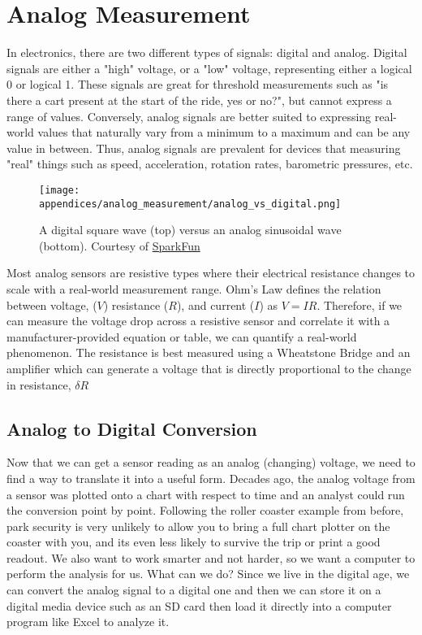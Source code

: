 \chapter{Analog Measurement} 
In electronics, there are two different types of signals: digital and analog.
Digital signals are either a "high" voltage, or a "low" voltage, representing either a logical 0 or logical 1.
These signals are great for threshold measurements such as "is there a cart present at the start of the ride, yes or no?", but cannot express a range of values.
Conversely, analog signals are better suited to expressing real-world values that naturally vary from a minimum to a maximum and can be any value in between.
Thus, analog signals are prevalent for devices that measuring "real" things such as speed, acceleration, rotation rates, barometric pressures, etc.

\begin{figure}[h!]
    \caption[Analog versus digital waveforms]{A digital square wave (top) versus an analog sinusoidal wave (bottom).
    Courtesy of \href{https://cdn.sparkfun.com/assets/learn_tutorials/2/1/5/analog_vs_digital.png}{SparkFun}}
    \centering
    \texttt{[image: appendices/analog\_measurement/analog\_vs\_digital.png]}
\end{figure}

Most analog sensors are resistive types where their electrical resistance changes to scale with a real-world measurement range.
Ohm's Law defines the relation between voltage, ($V$) resistance ($R$), and current ($I$) as $V=IR$.
Therefore, if we can measure the voltage drop across a resistive sensor and correlate it with a manufacturer-provided equation or table, we can quantify a real-world phenomenon.
The resistance is best measured using a Wheatstone Bridge and an amplifier which can generate a voltage that is directly proportional to the change in resistance, $\delta R$

\section{Analog to Digital Conversion} 
Now that we can get a sensor reading as an analog (changing) voltage, we need to find a way to translate it into a useful form.
Decades ago, the analog voltage from a sensor was plotted onto a chart with respect to time and an analyst could run the conversion point by point.
Following the roller coaster example from before, park security is very unlikely to allow you to bring a full chart plotter on the coaster with you, and its even less likely to survive the trip or print a good readout.
We also want to work smarter and not harder, so we want a computer to perform the analysis for us. 
What can we do?
Since we live in the digital age, we can convert the analog signal to a digital one and then we can store it on a digital media device such as an SD card then load it directly into a computer program like Excel to analyze it.

